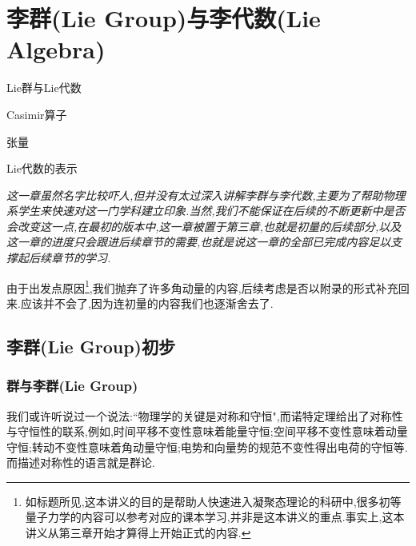 \ifx\allfiles\undefined



	\else
	\fi
\chapter{李群(Lie Group)与李代数(Lie Algebra)}
\begin{introduction}
	\item Lie群与Lie代数
	\item Casimir算子
	\item 张量
	\item Lie代数的表示
\end{introduction}

\textit{这一章虽然名字比较吓人,但并没有太过深入讲解李群与李代数,主要为了帮助物理系学生来快速对这一门学科建立印象.当然,我们不能保证在后续的不断更新中是否会改变这一点,在最初的版本中,这一章被置于第三章,也就是初量的后续部分,以及这一章的进度只会跟进后续章节的需要,也就是说这一章的全部已完成内容足以支撑起后续章节的学习.}


由于出发点原因\footnote{如标题所见,这本讲义的目的是帮助人快速进入凝聚态理论的科研中,很多初等量子力学的内容可以参考对应的课本学习,并非是这本讲义的重点.事实上,这本讲义从第三章开始才算得上开始正式的内容.},我们抛弃了许多角动量的内容,后续考虑是否以附录的形式补充回来.应该并不会了,因为连初量的内容我们也逐渐舍去了.
\section{李群(Lie Group)初步}
\subsection{群与李群(Lie Group)}
我们或许听说过一个说法:``物理学的关键是对称和守恒",而诺特定理给出了对称性与守恒性的联系,例如,时间平移不变性意味着能量守恒;空间平移不变性意味着动量守恒;转动不变性意味着角动量守恒;电势和向量势的规范不变性得出电荷的守恒等.而描述对称性的语言就是群论.

